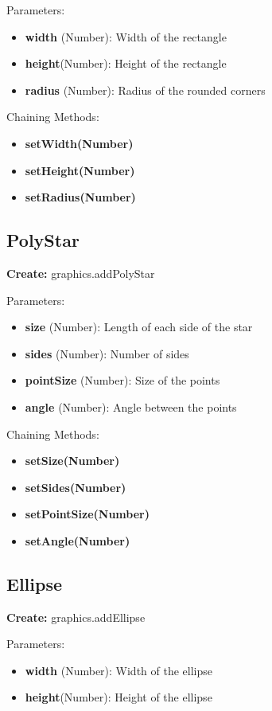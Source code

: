 \documentclass{article}
\begin{document}
Parameters:
\begin{itemize}
\item \textbf{width} (Number): Width of the rectangle
\item \textbf{height}(Number): Height of the rectangle
\item \textbf{radius} (Number): Radius of the rounded corners
\end{itemize}

Chaining Methods:
\begin{itemize}
\item \textbf{setWidth(Number)} 
\item \textbf{setHeight(Number)}
\item \textbf{setRadius(Number)}
\end{itemize}

\subsection{PolyStar}
\textbf{Create:} graphics.addPolyStar

Parameters:
\begin{itemize}
\item \textbf{size} (Number): Length of each side of the star
\item \textbf{sides} (Number): Number of sides
\item \textbf{pointSize} (Number): Size of the points
\item \textbf{angle} (Number): Angle between the points
\end{itemize}

Chaining Methods:
\begin{itemize}
\item \textbf{setSize(Number)} 
\item \textbf{setSides(Number)} 
\item \textbf{setPointSize(Number)} 
\item \textbf{setAngle(Number)}
\end{itemize}

\subsection{Ellipse}
\textbf{Create:} graphics.addEllipse

Parameters:
\begin{itemize}
\item \textbf{width} (Number): Width of the ellipse
\item \textbf{height}(Number): Height of the ellipse
\end{itemize}
\end{document}
